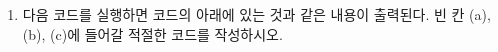 \documentclass{article}
\begin{document}
\begin{enumerate}[itemsep=30pt]
        \item 다음 코드를 실행하면 코드의 아래에 있는 것과 같은 내용이 출력된다. 빈 칸 (a), (b), (c)에 들어갈 적절한 코드를 작성하시오.
    \end{enumerate}
\end{document}
